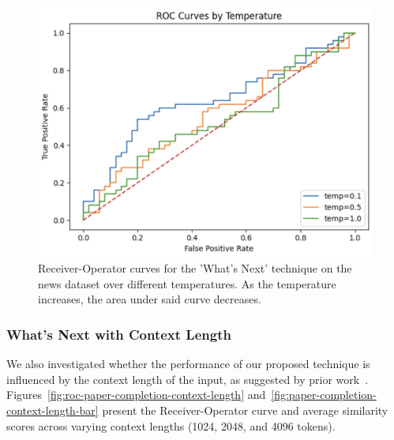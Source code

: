 \documentclass[sigconf]{acmart}
\begin{document}
\begin{figure}[htp]
  \centering
  \includegraphics[width=\columnwidth]{figures/roc_gpt_temperature.png}
    \caption{Receiver-Operator curves for the 'What's Next' technique on the news dataset over different temperatures. As the temperature increases, the area under said curve decreases.}
    \label{fig:roc-news-completion-temperature}
\end{figure}

\subsubsection{What's Next with Context Length}

We also investigated whether the performance of our proposed technique is influenced by the context length of the input, as suggested by prior work~\cite{arxivScalingMembership}. Figures~\ref{fig:roc-paper-completion-context-length} and~\ref{fig:paper-completion-context-length-bar} present the Receiver-Operator curve and average similarity scores across varying context lengths (1024, 2048, and 4096 tokens).
\end{document}

